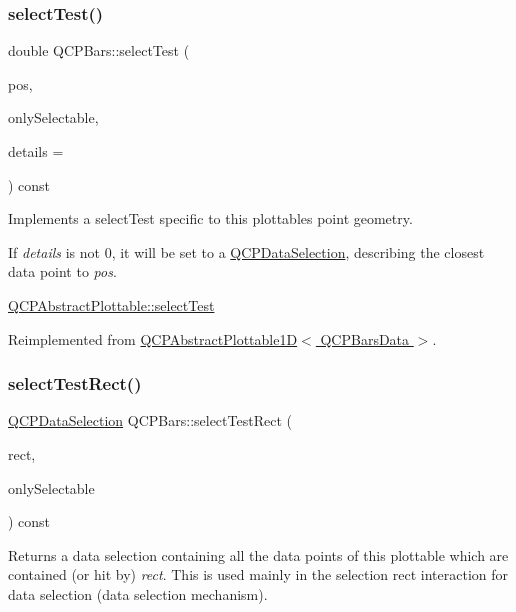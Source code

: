 \subsubsection{\texorpdfstring{select\+Test()}{selectTest()}}
{\footnotesize\ttfamily double Q\+C\+P\+Bars\+::select\+Test (\begin{DoxyParamCaption}\item[{const Q\+PointF \&}]{pos,  }\item[{bool}]{only\+Selectable,  }\item[{Q\+Variant $\ast$}]{details = {} }\end{DoxyParamCaption}) const\hspace{0.3cm}{\ttfamily [virtual]}}

Implements a select\+Test specific to this plottable\textquotesingle{}s point geometry.

If {\itshape details} is not 0, it will be set to a \hyperlink{classQCPDataSelection}{Q\+C\+P\+Data\+Selection}, describing the closest data point to {\itshape pos}.

\hyperlink{classQCPAbstractPlottable_addb3f5c41f007a78c3e142cc605bc712}{Q\+C\+P\+Abstract\+Plottable\+::select\+Test} 

Reimplemented from \hyperlink{classQCPAbstractPlottable1D_a4611b43bcb6441b2154eb4f4e0a33db2}{Q\+C\+P\+Abstract\+Plottable1\+D$<$ Q\+C\+P\+Bars\+Data $>$}.

\mbox{\label{classQCPBars_ab03bb6125c3e983b89d694f75ce6b3d5}} 
\subsubsection{\texorpdfstring{select\+Test\+Rect()}{selectTestRect()}}
{\footnotesize\ttfamily \hyperlink{classQCPDataSelection}{Q\+C\+P\+Data\+Selection} Q\+C\+P\+Bars\+::select\+Test\+Rect (\begin{DoxyParamCaption}\item[{const Q\+RectF \&}]{rect,  }\item[{bool}]{only\+Selectable }\end{DoxyParamCaption}) const\hspace{0.3cm}{\ttfamily [virtual]}}





Returns a data selection containing all the data points of this plottable which are contained (or hit by) {\itshape rect}. This is used mainly in the selection rect interaction for data selection (data selection mechanism).

